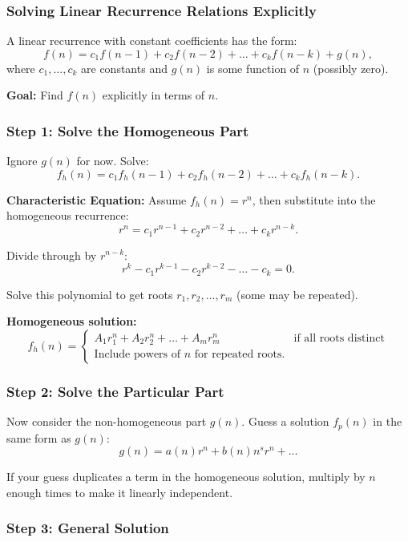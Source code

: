 \documentclass[12pt]{extarticle}
\begin{document}
\subsubsection{Solving Linear Recurrence Relations Explicitly}

A linear recurrence with constant coefficients has the form:
\[
f(n) = c_1 f(n-1) + c_2 f(n-2) + \dots + c_k f(n-k) + g(n),
\]
where $c_1, \dots, c_k$ are constants and $g(n)$ is some function of $n$ (possibly zero).

\textbf{Goal:} Find $f(n)$ explicitly in terms of $n$.

\subsubsection{Step 1: Solve the Homogeneous Part}

Ignore $g(n)$ for now. Solve:
\[
f_h(n) = c_1 f_h(n-1) + c_2 f_h(n-2) + \dots + c_k f_h(n-k).
\]

\textbf{Characteristic Equation:} Assume $f_h(n) = r^n$, then substitute into the homogeneous recurrence:
\[
r^n = c_1 r^{n-1} + c_2 r^{n-2} + \dots + c_k r^{n-k}.
\]

Divide through by $r^{n-k}$:
\[
r^k - c_1 r^{k-1} - c_2 r^{k-2} - \dots - c_k = 0.
\]

Solve this polynomial to get roots $r_1, r_2, \dots, r_m$ (some may be repeated).

\textbf{Homogeneous solution:}
\[
f_h(n) =
\begin{cases}
A_1 r_1^n + A_2 r_2^n + \dots + A_m r_m^n & \text{if all roots distinct} \\
\text{Include powers of } n \text{ for repeated roots.}
\end{cases}
\]

\subsubsection{Step 2: Solve the Particular Part}

Now consider the non-homogeneous part $g(n)$. Guess a solution $f_p(n)$ in the same form as $g(n)$:
\[
g(n) = a(n) r^n + b(n) n^s r^n + \dots
\]

\begin{remarkbox}
If your guess duplicates a term in the homogeneous solution, multiply by $n$ enough times to make it linearly independent.
\end{remarkbox}

\subsubsection{Step 3: General Solution}
\end{document}

